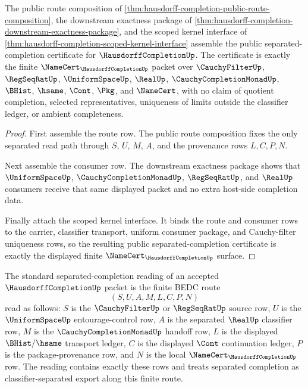 \begin{theorem}
\label{thm:hausdorff-completion-public-separated-certificate}
The public route composition of \autoref{thm:hausdorff-completion-public-route-composition}, the downstream exactness package of \autoref{thm:hausdorff-completion-downstream-exactness-package}, and the scoped kernel interface of \autoref{thm:hausdorff-completion-scoped-kernel-interface} assemble the public separated-completion certificate for $\HausdorffCompletionUp$. The certificate is exactly the finite $\NameCert_{\HausdorffCompletionUp}$ packet over $\CauchyFilterUp$, $\RegSeqRatUp$, $\UniformSpaceUp$, $\RealUp$, $\CauchyCompletionMonadUp$, $\BHist$, $\hsame$, $\Cont$, $\Pkg$, and $\NameCert$, with no claim of quotient completion, selected representatives, uniqueness of limits outside the classifier ledger, or ambient completeness.
\end{theorem}
\begin{proof}
First assemble the route row. The public route composition fixes the only separated read path through $S$, $U$, $M$, $A$, and the provenance rows $L,C,P,N$.

Next assemble the consumer row. The downstream exactness package shows that $\UniformSpaceUp$, $\CauchyCompletionMonadUp$, $\RegSeqRatUp$, and $\RealUp$ consumers receive that same displayed packet and no extra host-side completion data.

Finally attach the scoped kernel interface. It binds the route and consumer rows to the carrier, classifier transport, uniform consumer package, and Cauchy-filter uniqueness rows, so the resulting public separated-completion certificate is exactly the displayed finite $\NameCert_{\HausdorffCompletionUp}$ surface.
\end{proof}

\begin{definition}
\label{def:hausdorff-completion-standard-separated-reading}
The standard separated-completion reading of an accepted $\HausdorffCompletionUp$ packet is the finite BEDC route
$$
(S,U,A,M,L,C,P,N)
$$
read as follows: $S$ is the $\CauchyFilterUp$ or $\RegSeqRatUp$ source row, $U$ is the $\UniformSpaceUp$ entourage-control row, $A$ is the separated $\RealUp$ classifier row, $M$ is the $\CauchyCompletionMonadUp$ handoff row, $L$ is the displayed $\BHist/\hsame$ transport ledger, $C$ is the displayed $\Cont$ continuation ledger, $P$ is the package-provenance row, and $N$ is the local $\NameCert_{\HausdorffCompletionUp}$ row. The reading contains exactly these rows and treats separated completion as classifier-separated export along this finite route.
\end{definition}

